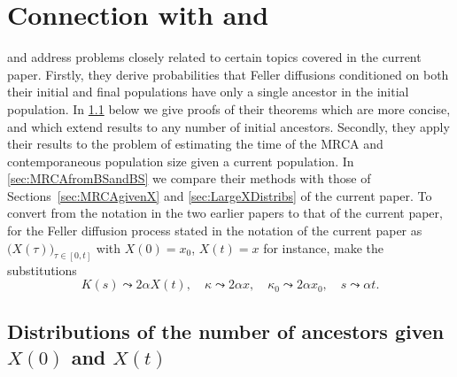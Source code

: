 \documentclass[preprint,12pt]{elsarticle}
\begin{document}
%
%


\section{Connection with \citet{burden2016genetic} and \citet{BurdenSoewongsoso19}}
\label{sec:connectionBSandBS}

\citet{burden2016genetic} and \citet{BurdenSoewongsoso19} address problems closely related to certain topics covered in the current paper.  
Firstly, they derive probabilities that Feller diffusions conditioned on both their initial and final populations have only a single ancestor 
in the initial population.  In \ref{sec:ancestorsGiven_x0andx} below we give proofs of their theorems which are more concise, and which extend results 
to any number of initial ancestors.  Secondly, they apply their results to the problem of estimating the time of the MRCA and contemporaneous 
population size given a current population.  In \ref{sec:MRCAfromBSandBS} we compare their methods with those of Sections~\ref{sec:MRCAgivenX} 
and \ref{sec:LargeXDistribs} of the current paper.  To convert from the notation in the two earlier papers to that of the current paper, for the Feller diffusion process 
stated in the notation of the current paper as $\big(X(\tau)\big)_{\tau \in [0, t]}$ with $X(0) = x_0$, $X(t) = x$ for instance, make the substitutions 
\begin{equation*}
K(s) \leadsto 2\alpha X(t), \quad \kappa \leadsto 2\alpha x, \quad \kappa_0 \leadsto 2\alpha x_0, \quad s \leadsto \alpha t.  
\end{equation*}

%

\subsection{Distributions of the number of ancestors given $X(0)$ and $X(t)$}
\label{sec:ancestorsGiven_x0andx}
\end{document}
